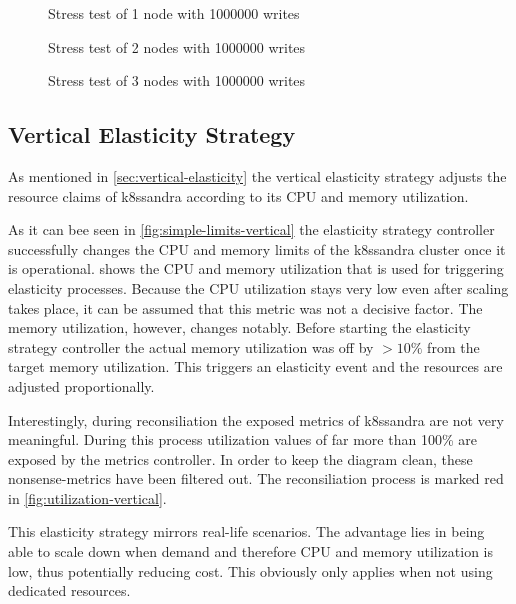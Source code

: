 \begin{figure}
    \centering
    
    \caption{Stress test of 1 node with 1000000 writes}
    \label{fig:stress-1000000writes-1node}
\end{figure}

\begin{figure}
    \centering
    
    \caption{Stress test of 2 nodes with 1000000 writes}
    \label{fig:stress-1000000writes-2node}
\end{figure}

\begin{figure}
    \centering
    
    \caption{Stress test of 3 nodes with 1000000 writes}
    \label{fig:stress-1000000writes-3node}
\end{figure}

\subsection{Vertical Elasticity Strategy}

As mentioned in \cref{sec:vertical-elasticity} the vertical elasticity strategy adjusts the resource claims of k8ssandra according to its CPU and memory utilization.

As it can bee seen in \cref{fig:simple-limits-vertical} the elasticity strategy controller successfully changes the CPU and memory limits of the k8ssandra cluster once it is operational.  shows the CPU and memory utilization that is used for triggering elasticity processes. Because the CPU utilization stays very low even after scaling takes place, it can be assumed that this metric was not a decisive factor. The memory utilization, however, changes notably. Before starting the elasticity strategy controller the actual memory utilization was off by \(>10\%\) from the target memory utilization. This triggers an elasticity event and the resources are adjusted proportionally.

Interestingly, during reconsiliation the exposed metrics of k8ssandra are not very meaningful. During this process utilization values of far more than 100\% are exposed by the metrics controller. In order to keep the diagram clean, these nonsense-metrics have been filtered out. The reconsiliation process is marked red in \cref{fig:utilization-vertical}.

This elasticity strategy mirrors real-life scenarios. The advantage lies in being able to scale down when demand and therefore CPU and memory utilization is low, thus potentially reducing cost. This obviously only applies when not using dedicated resources.

